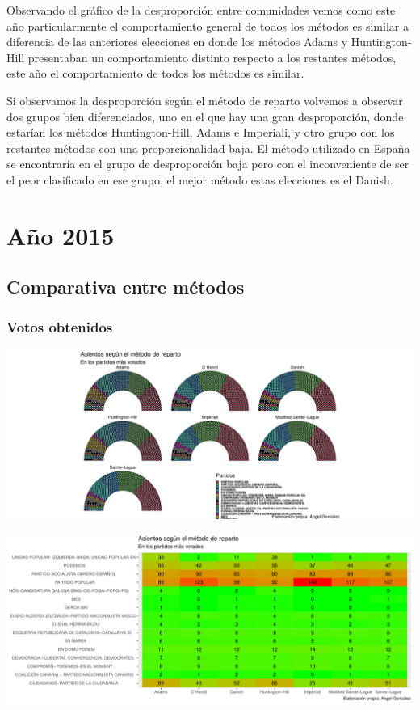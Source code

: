 \documentclass[12pt,a4paper,]{book}
\numberwithin{dummy}{section}
\theoremstyle{ocrenumbox}
\theoremstyle{blacknumex}
\theoremstyle{blacknumbox}
\theoremstyle{ocrenum}
\theoremstyle{ocrenum}
\begin{document}
Observando el gráfico de la desproporción entre comunidades vemos como
este año particularmente el comportamiento general de todos los métodos
es similar a diferencia de las anteriores elecciones en donde los
métodos Adams y Huntington-Hill presentaban un comportamiento distinto
respecto a los restantes métodos, este año el comportamiento de todos
los métodos es similar.

Si observamos la desproporción según el método de reparto volvemos a
observar dos grupos bien diferenciados, uno en el que hay una gran
desproporción, donde estarían los métodos Huntington-Hill, Adams e
Imperiali, y otro grupo con los restantes métodos con una
proporcionalidad baja. El método utilizado en España se encontraría en
el grupo de desproporción baja pero con el inconveniente de ser el peor
clasificado en ese grupo, el mejor método estas elecciones es el Danish.

\hypertarget{auxf1o-2015}{%
\section{Año 2015}\label{auxf1o-2015}}

\hypertarget{comparativa-entre-muxe9todos-11}{%
\subsection{Comparativa entre
métodos}\label{comparativa-entre-muxe9todos-11}}

\hypertarget{votos-obtenidos-11}{%
\subsubsection{Votos obtenidos}\label{votos-obtenidos-11}}

\begin{center}\includegraphics[width=0.95\linewidth]{figurasR/unnamed-chunk-161-1} \end{center}

\begin{center}\includegraphics[width=0.95\linewidth]{figurasR/unnamed-chunk-161-2} \end{center}
\end{document}
